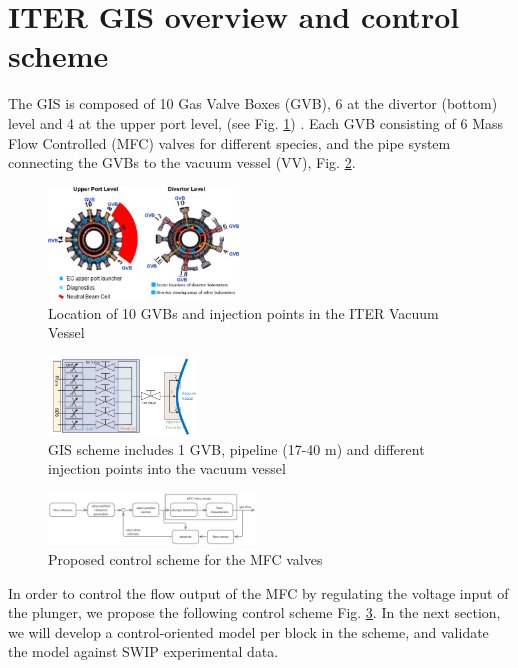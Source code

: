 \documentclass[letterpaper, 10pt, conference]{ieeeconf}
\begin{document}
\section{ITER GIS overview and control scheme}\label{sec:overview}
The GIS is composed of 10 Gas Valve Boxes (GVB),  6 at the divertor (bottom) level and 4 at the upper port level, (see Fig. \ref{fig:GIS}) \cite{GIS_2012}. Each GVB consisting of 6 Mass Flow Controlled (MFC) valves for different species, and the pipe system connecting the GVBs to the vacuum vessel (VV), Fig. \ref{fig:GIS_scheme}.
\begin{figure}[!ht]
     \centering
     \includegraphics[width=0.45\textwidth]{GIS_ip}
     \caption{Location of 10 GVBs and injection points in the ITER Vacuum Vessel \cite{GIS_2012}}
     \label{fig:GIS}
\end{figure}
\begin{figure}[!ht]
     \centering
     \includegraphics[width=0.35\textwidth]{GIS_scheme.png}
     \caption{GIS scheme includes 1 GVB, pipeline (17-40 m) and different injection points into the vacuum vessel}
     \label{fig:GIS_scheme}
\end{figure}
\begin{figure}[!ht]
    \centering
    \includegraphics[width=0.49\textwidth]{ctrl_scheme}
    \caption{Proposed control scheme for the MFC valves}
    \label{fig:ctrlscheme}
\end{figure}

In order to control the flow output of the MFC by regulating the voltage input of the plunger, we propose the following control scheme Fig. \ref{fig:ctrlscheme}. In the next section, we will develop a control-oriented model per block in the scheme, and validate the model against SWIP experimental data.
\end{document}
